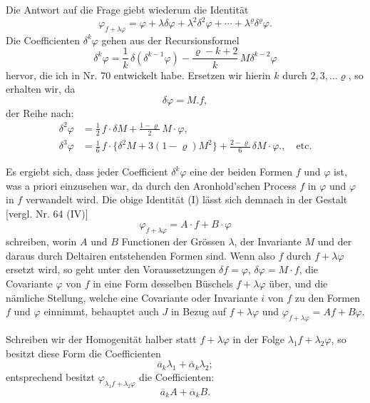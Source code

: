 \documentclass[11pt]{article}
\providecommand{\gesperrt}[1]{\textls[130]{#1}}
\providecommand{\weq}[2]{\begin{equation}\tag{#1}#2\end{equation}}
\begin{document}
Die Antwort auf die Frage giebt wiederum die Identität
\weq{I}{\varphi_{f+\lambda\varphi} = \varphi + \lambda\delta\varphi + \lambda^2\delta^2\varphi + \cdots + \lambda^\varrho\delta^\varrho\varphi.}
Die Coefficienten $\delta^k\varphi$ gehen aus der Recursionsformel
\[
\delta^k\varphi = \frac{1}{k}\,\delta(\delta^{k-1}\varphi) - \frac{\varrho-k+2}{k}\,M\delta^{k-2}\varphi
\]
hervor, die ich in Nr. 70 entwickelt habe. Ersetzen wir hierin $k$ durch $2, 3, \dots \varrho$, so erhalten wir, da
\[
\delta\varphi = M.f,
\]
der Reihe nach:
\[
\begin{aligned}
\delta^2\varphi &= \frac{1}{2}\,f\cdot\delta M + \frac{1-\varrho}{2}\,M\cdot\varphi,\\
\delta^3\varphi &= \frac{1}{6}\,f\cdot\{\delta^2 M + 3(1-\varrho)M^2\} + \frac{2-\varrho}{6}\,\delta M\cdot\varphi., \quad \text{etc.}
\end{aligned}
\]

Es ergiebt sich, dass jeder Coefficient $\delta^k\varphi$ eine \gesperrt{lineare Function} der beiden Formen $f$ und $\varphi$ ist, was a priori einzusehen war, da durch den Aronhold'schen Process $f$ in $\varphi$ und $\varphi$ in $f$ verwandelt wird. Die obige Identität (I) lässt sich demnach in der Gestalt [vergl. Nr. 64 (IV)]
\[
\varphi_{f+\lambda\varphi} = A\cdot f + B\cdot\varphi
\]
schreiben, worin $A$ und $B$ Functionen der Grössen $\lambda$, der Invariante $M$ und der daraus durch Deltairen entstehenden Formen sind. Wenn also $f$ durch $f+\lambda\varphi$ ersetzt wird, so geht unter den Voraussetzungen $\delta f=\varphi$, $\delta\varphi=M\cdot f$, die Covariante $\varphi$ von $f$ in eine Form desselben Büschels $f+\lambda\varphi$ über, und die nämliche Stellung, welche eine Covariante oder Invariante $i$ von $f$ zu den Formen $f$ und $\varphi$ einnimmt, behauptet auch $J$ in Bezug auf $f+\lambda\varphi$ und $\varphi_{f+\lambda\varphi}=Af+B\varphi$.

Schreiben wir der Homogenität halber statt $f+\lambda\varphi$ in der Folge $\lambda_1 f+\lambda_2\varphi$, so besitzt diese Form die Coefficienten
\[
\overline a_k\lambda_1 + \overline\alpha_k\lambda_2;
\]
entsprechend besitzt $\varphi_{\lambda_1 f+\lambda_2\varphi}$ die Coefficienten:
\[
\overline a_k A + \overline\alpha_k B.
\]
\end{document}
